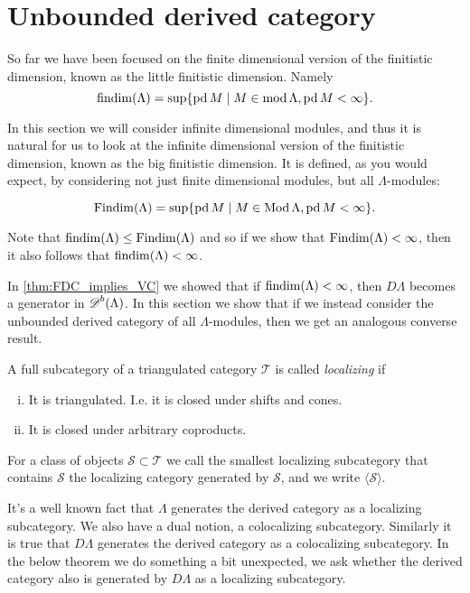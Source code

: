 \section{Unbounded derived category}\label{sec:Unbounded_derived_category}

So far we have been focused on the finite dimensional version of the finitistic dimension, known as the little finitistic dimension. Namely 
$$\operatorname{findim}(\Lambda) = \sup\{\operatorname{pd} M \mid M \in \operatorname{mod}\Lambda, \operatorname{pd} M < \infty\}.$$

In this section we will consider infinite dimensional modules, and thus it is natural for us to look at the infinite dimensional version of the finitistic dimension, known as the big finitistic dimension. It is defined, as you would expect, by considering not just finite dimensional modules, but all $\Lambda$-modules:

$$\operatorname{Findim}(\Lambda) = \sup\{\operatorname{pd} M \mid M \in \operatorname{Mod}\Lambda, \operatorname{pd} M < \infty\}.$$

Note that $\operatorname{findim}(\Lambda) \leq \operatorname{Findim}(\Lambda)$ and so if we show that $\operatorname{Findim}(\Lambda) < \infty$, then it also follows that $\operatorname{findim}(\Lambda) < \infty$.

In \cref{thm:FDC_implies_VC} we showed that if $\operatorname{findim}(\Lambda) < \infty$, then $D\Lambda$ becomes a generator in $\operatorname{\mathscr{D}}^b(\Lambda)$. In this section we show that if we instead consider the unbounded derived category of all $\Lambda$-modules, then we get an analogous converse result.

\begin{defn}
	A full subcategory of a triangulated category $\mathcal T$ is called \emph{localizing} if
	\begin{enumerate}[i)]
		\item It is triangulated. I.e. it is closed under shifts and cones.
		\item It is closed under arbitrary coproducts.
	\end{enumerate}
	For a class of objects $\mathcal S \subset \mathcal T$ we call the smallest localizing subcategory that contains $\mathcal S$ the localizing category generated by $\mathcal S$, and we write $\langle \mathcal S \rangle$.
\end{defn}

It's a well known fact that $\Lambda$ generates the derived category as a localizing subcategory. We also have a dual notion, a colocalizing subcategory. Similarly it is true that $D\Lambda$ generates the derived category as a colocalizing subcategory. In the below theorem we do something a bit unexpected, we ask whether the derived category also is generated by $D\Lambda$ as a localizing subcategory.

